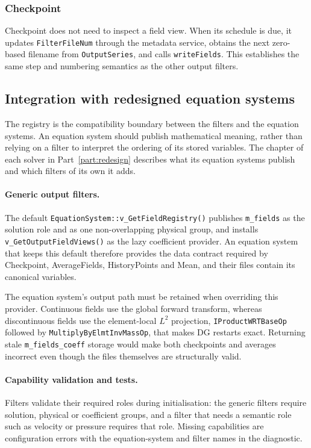 \subsubsection{Checkpoint}

Checkpoint does not need to inspect a field view. When its schedule is due, it
updates \texttt{FilterFileNum} through the metadata service, obtains the next
zero-based filename from \texttt{OutputSeries}, and calls
\texttt{writeFields}. This establishes the same step and numbering semantics as
the other output filters.

\subsection{Integration with redesigned equation systems}

The registry is the compatibility boundary between the filters and the
equation systems. An equation system should publish mathematical meaning,
rather than relying on a filter to interpret the ordering of its stored
variables. The chapter of each solver in Part~\ref{part:redesign} describes
what its equation systems publish and which filters of its own it adds.

\paragraph{Generic output filters.}
The default \texttt{EquationSystem::v\_GetFieldRegistry()} publishes
\texttt{m\_fields} as the solution role and as one non-overlapping physical
group, and installs \texttt{v\_GetOutputFieldViews()} as the lazy coefficient
provider. An equation system that keeps this default therefore provides the
data contract required by Checkpoint, AverageFields, HistoryPoints and Mean,
and their files contain its canonical variables.

The equation system's output path must be retained when overriding this
provider. Continuous fields use the global forward transform, whereas
discontinuous fields use the element-local $L^2$ projection,
\texttt{IProductWRTBaseOp} followed by \texttt{MultiplyByElmtInvMassOp}, that
makes DG restarts exact. Returning stale
\texttt{m\_fields\_coeff} storage would make both checkpoints and averages
incorrect even though the files themselves are structurally valid.

\paragraph{Capability validation and tests.}
Filters validate their required roles during initialisation: the generic
filters require solution, physical or coefficient groups, and a filter that
needs a semantic role such as velocity or pressure requires that role.
Missing capabilities are configuration errors with the equation-system and
filter names in the diagnostic.


